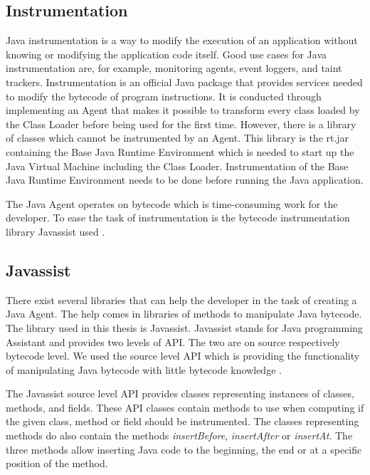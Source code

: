\subsection{Instrumentation}
Java instrumentation is a way to modify the execution of an application without knowing or modifying the application code itself. Good use cases for Java instrumentation are, for example, monitoring agents, event loggers, and taint trackers. Instrumentation is an official Java package that provides services needed to modify the bytecode of program instructions. It is conducted through implementing an Agent that makes it possible to transform every class loaded by the Class Loader before being used for the first time. However, there is a library of classes which cannot be instrumented by an Agent. This library is the rt.jar containing the Base Java Runtime Environment which is needed to start up the Java Virtual Machine including the Class Loader. Instrumentation of the Base Java Runtime Environment needs to be done before running the Java application.

The Java Agent operates on bytecode which is time-consuming work for the developer. To ease the task of instrumentation is the bytecode instrumentation library Javassist used \parencite{Java_Instrument, Javassist}.



\subsection{Javassist}
There exist several libraries that can help the developer in the task of creating a Java Agent. The help comes in libraries of methods to manipulate Java bytecode. The library used in this thesis is Javassist. Javassist stands for Java programming Assistant and provides two levels of API. The two are on source respectively bytecode level. We used the source level API which is providing the functionality of manipulating Java bytecode with little bytecode knowledge \parencite{Javassist}.

The Javassist source level API provides classes representing instances of classes, methods, and fields. These API classes contain methods to use when computing if the given class, method or field should be instrumented. The classes representing methods do also contain the methods \textit{insertBefore}, \textit{insertAfter​} or \textit{insertAt}. The three methods allow inserting Java code to the beginning, the end or at a specific position of the method.